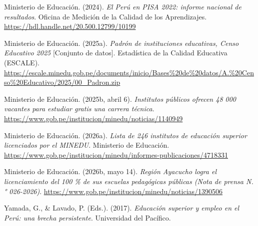 \documentclass[
  jou,
  floatsintext,
  longtable,
  a4paper,
  nolmodern,
  notxfonts,
  notimes,
  12pt,
  colorlinks=true,linkcolor=blue,citecolor=blue,urlcolor=blue]{apa7}
\newlength{\cslhangindent}
\newenvironment{CSLReferences}[2] %
 {\begin{list}{}{%
  \setlength{\itemindent}{0pt}
  \setlength{\leftmargin}{0pt}
  \setlength{\parsep}{0pt}
  \ifodd #1
   \setlength{\leftmargin}{\cslhangindent}
   \setlength{\itemindent}{-1\cslhangindent}
  \fi
  \setlength{\itemsep}{#2\baselineskip}}}
 {\end{list}}
\begin{document}
\begin{CSLReferences}{1}{0}
Ministerio de Educación. (2024). \emph{El {Perú} en {PISA} 2022: informe
nacional de resultados}. Oficina de Medición de la Calidad de los
Aprendizajes. \url{https://hdl.handle.net/20.500.12799/10199}

Ministerio de Educación. (2025a). \emph{Padrón de instituciones
educativas, {Censo Educativo} 2025} {[}Conjunto de datos{]}. Estadística
de la Calidad Educativa (ESCALE).
\url{https://escale.minedu.gob.pe/documents/inicio/Bases\%20de\%20datos/A.\%20Censo\%20Educativo/2025/00_Padron.zip}

Ministerio de Educación. (2025b, abril 6). \emph{Institutos públicos
ofrecen 48 000 vacantes para estudiar gratis una carrera técnica}.
\url{https://www.gob.pe/institucion/minedu/noticias/1140949}

Ministerio de Educación. (2026a). \emph{Lista de 246 institutos de
educación superior licenciados por el {MINEDU}}. Ministerio de
Educación.
\url{https://www.gob.pe/institucion/minedu/informes-publicaciones/4718331}

Ministerio de Educación. (2026b, mayo 14). \emph{Región Ayacucho logra
el licenciamiento del 100 \% de sus escuelas pedagógicas públicas (Nota
de prensa N.° 026-2026)}.
\url{https://www.gob.pe/institucion/minedu/noticias/1390506}

Yamada, G., \& Lavado, P. (Eds.). (2017). \emph{Educación superior y
empleo en el {Perú}: una brecha persistente}. Universidad del Pacífico.

\end{CSLReferences}
\end{document}
